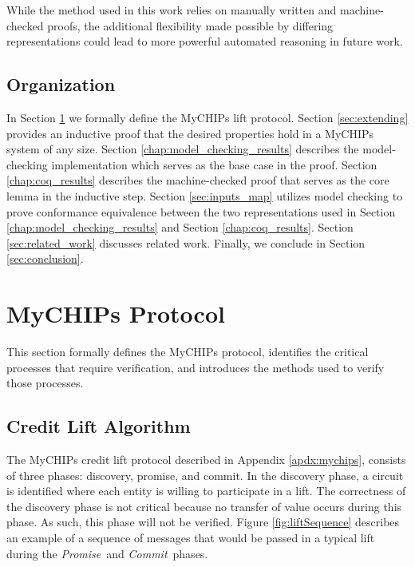 \documentclass[runningheads]{llncs}
\newcommand{\promise}{\emph{Promise}}
\newcommand{\commit}{\emph{Commit}}
\newcommand{\figref}[1]{Figure \ref{#1}}
\newcommand{\secref}[1]{Section \ref{#1}}
\newif\ifcomments
\newif\ifkylecomments
\newcommand{\egm}[1]{\ifcomments\textcolor{orange}{egm: #1}\fi}
\newcommand{\krs}[1]{\ifkylecomments\textcolor{blue}{krs: #1}\fi}
\begin{document}
While the method used in this work relies on manually written and machine-checked proofs, the additional flexibility made possible by differing representations could lead to more powerful automated reasoning in future work.

\subsection{Organization}
In \secref{sec:protocol_def} we formally define the MyCHIPs lift protocol. \secref{sec:extending} provides an inductive proof that the desired properties hold in a MyCHIPs system of any size. \secref{chap:model_checking_results} describes the model-checking implementation which serves as the base case in the proof. \secref{chap:coq_results} describes the machine-checked proof that serves as the core lemma in the inductive step. \secref{sec:inputs_map} utilizes model checking to prove conformance equivalence between the two representations used in \secref{chap:model_checking_results} and \secref{chap:coq_results}. \secref{sec:related_work} discusses related work. Finally, we conclude in \secref{sec:conclusion}.

\krs{ I think this is much better. \egm{Add some high-level discussion of very related work to frame how your solution is the same, or different, from what others have done to solve this issue. If other works just come up short, then state that, and then state how you are filling the gap. This discussion should be woven into the current narrative at the appropriate points. Finally, add two paragraphs to the end: one that summarizes the contributions of our work, and the other that gives the organization of the rest of the document.}}

\section{MyCHIPs Protocol}
\label{sec:protocol_def}
This section formally defines the MyCHIPs protocol, identifies the critical processes that require verification, and introduces the methods used to verify those processes.

\subsection{Credit Lift Algorithm}\label{sec:liftAlgorithm}
The MyCHIPs credit lift protocol described in Appendix \ref{apdx:mychips}, consists of three phases: discovery, promise, and commit. In the discovery phase, a circuit is identified where each entity is willing to participate in a lift. The correctness of the discovery phase is not critical because no transfer of value occurs during this phase. As such, this phase will not be verified.
\figref{fig:liftSequence} describes an example of a sequence of messages that would be passed in a typical lift during the \promise\ and \commit\ phases.
\end{document}
